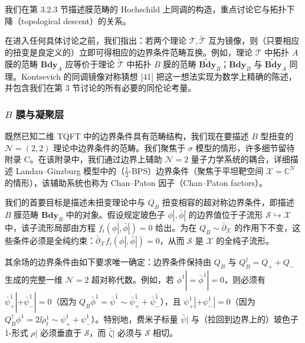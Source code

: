 

我们在第 3.2.3 节描述膜范畴的 Hochschild 上同调的构造，重点讨论它与拓扑下降（topological descent）的关系。

在进入任何具体讨论之前，我们指出：若两个理论 $\mathcal{T},\widetilde{\mathcal{T}}$ 互为镜像，则（只要相应的扭变是良定义的）立即可得相应的边界条件范畴互换。例如，理论 $\mathcal{T}$ 中拓扑 $A$ 膜的范畴 $\mathbf{Bdy}_A$ 应等价于理论 $\widetilde{\mathcal{T}}$ 中拓扑 $B$ 膜的范畴 $\widetilde{\mathbf{Bdy}}_B$；$\mathbf{Bdy}_B$ 与 $\widetilde{\mathbf{Bdy}}_A$ 同理。Kontsevich 的同调镜像对称猜想 [41] 把这一想法实现为数学上精确的陈述，并包含我们在第 3 节讨论的所有必要的同伦论考量。

\subsubsection{$B$ 膜与凝聚层}

既然已知二维 TQFT 中的边界条件具有范畴结构，我们现在要描述 $B$ 型扭变的 $\mathcal{N}=(2,2)$ 理论中边界条件的范畴。我们聚焦于 $\sigma$ 模型的情形，许多细节留待附录 C。在该附录中，我们通过边界上辅助 $\mathcal{N}=2$ 量子力学系统的耦合，详细描述 Landau--Ginzburg 模型中的（$\tfrac12$-BPS）边界条件（聚焦于平坦靶空间 $\mathcal{X}=\mathbb{C}^{N}$ 的情形），该辅助系统也称为 Chan--Paton 因子（Chan--Paton factors）。

我们的首要目标是描述未扭变理论中与 $Q_B$ 扭变相容的超对称边界条件，即描述 $B$ 膜范畴 $\mathbf{Bdy}_B$ 中的对象。假设规定玻色子 $\phi|,\bar\phi|$ 的边界值位于子流形 $\mathcal{S}\hookrightarrow\mathcal{X}$ 中，该子流形局部由方程 $f_i(\phi|,\bar\phi|)=0$ 给出。为在 $Q_B\sim\bar\partial_{\mathcal{X}}$ 的作用下不变，这些条件必须是全纯约束：$\bar\partial_{\mathcal{X}}f_i(\phi|,\bar\phi|)=0$，从而 $\mathcal{S}$ 是 $\mathcal{X}$ 的全纯子流形。

其余场的边界条件由如下要求唯一确定：边界条件保持由 $Q_B$ 与 $Q_B^{\dagger}=Q_++Q_-$ 生成的完整一维 $\mathcal{N}=2$ 超对称代数。例如，若 $\phi^{1}|=\bar\phi^{\bar 1}|=0$，则必须有 $\bar\psi^{\bar 1}_{+}|+\bar\psi^{\bar 1}_{-}|=0$（因为 $Q_B\bar\phi^{\bar 1}=\bar\psi^{\bar 1}\sim\bar\psi^{\bar 1}_{+}+\bar\psi^{\bar 1}_{-}$），且 $\psi^{1}_{+}|+\psi^{1}_{-}|=0$（因为 $Q_B^{\dagger}\phi^{1}=2\ii\rho^{1}_{t}\sim\psi^{1}_{+}+\psi^{1}_{-}$）。特别地，费米子标量 $\bar\psi|$ 与（拉回到边界上的）玻色子 1-形式 $\rho|$ 必须垂直于 $\mathcal{S}$，而 $\bar\zeta|$ 必须与 $\mathcal{S}$ 相切。

